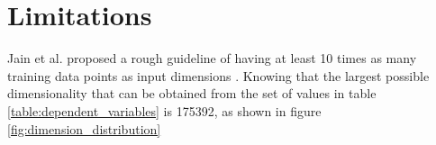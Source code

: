 \section{Limitations}

Jain et al. proposed a rough guideline of having at least 10 times as many training data points as input dimensions \cite{jain_2000_statistical}. Knowing that the largest possible dimensionality that can be obtained from the set of values in table \ref{table:dependent_variables} is 175392, as shown in figure \ref{fig:dimension_distribution}



